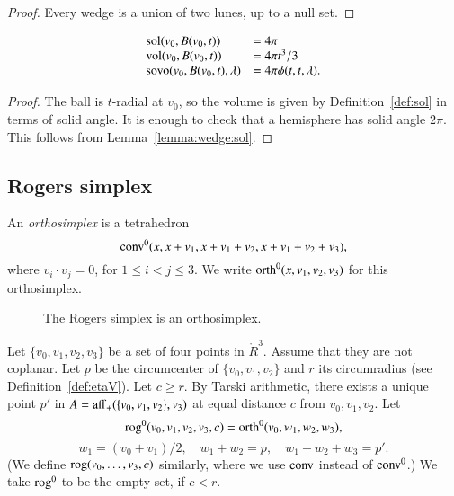 \begin{proof} Every wedge is a union of two lunes, up to a null set.
\end{proof}

\begin{lemma}  
   $$
   \begin{array}{lll}
    {\operatorname{sol}}(v_0,B(v_0,t)) &= 4\pi\\
    {\operatorname{vol}}(v_0,B(v_0,t)) &= 4\pi t^3/3\\
    {\operatorname{sovo}}(v_0,B(v_0,t),\lambda) &= 4 \pi \phi(t,t,\lambda).
   \end{array}
   $$
\end{lemma}

\begin{proof}
The ball is $t$-radial at $v_0$, so the volume is given by
Definition~\ref{def:sol} in terms of solid angle.  It is enough
to check that a hemisphere has solid angle $2\pi$.  This follows
from Lemma~\ref{lemma:wedge:sol}.
\end{proof}  




\subsection{Rogers simplex}

\begin{definition} 
An {\it orthosimplex} is a tetrahedron
    $${\operatorname{conv}}^0(x,x+v_1,x+v_1+v_2,x+v_1+v_2+v_3),$$
where $v_i\cdot v_j=0$, for $1\le i<j\le 3$.   We write
${\operatorname{orth}}^0(x,v_1,v_2,v_3)$ for this orthosimplex.
\end{definition}

\begin{figure}[htb]
  \centering
  \caption{The Rogers simplex is an orthosimplex.}
\end{figure}


\begin{definition} 
Let $\{v_0,v_1,v_2,v_3\}$ be a set of four points in $\ring{R}^3$.
Assume that they are not coplanar.  Let $p$ be the circumcenter
of $\{v_0,v_1,v_2\}$ and $r$ its circumradius (see Definition~\ref{def:etaV}).  Let $c\ge r$.
By Tarski arithmetic, %
there exists a unique point $p'$ in $A={\operatorname{aff}}_+(\{v_0,v_1,v_2\},v_3)$ at equal distance $c$
from $v_0,v_1,v_2$.
Let 
$$
    {\operatorname{rog}}^0(v_0,v_1,v_2,v_3,c) = 
    {\operatorname{orth}}^0(v_0,w_1,w_2,w_3),
$$
$$
     w_1=(v_0+v_1)/2,\quad w_1+w_2=p,\quad w_1+w_2+w_3=p'.
$$
(We define ${\operatorname{rog}}(v_0,\ldots,v_3,c)$ similarly, where we use
${\operatorname{conv}}$ instead of ${\operatorname{conv}}^0$.)
We take ${\operatorname{rog}}^0$ to be the empty set, if $c< r$.
\end{definition}

